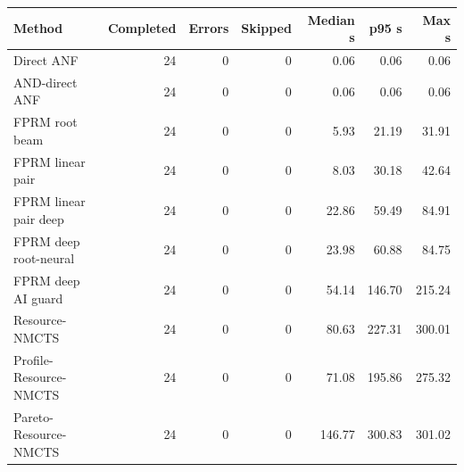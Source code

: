\begin{tabular}{lrrrrrr}
\toprule
Method & Completed & Errors & Skipped & Median s & p95 s & Max s \\
\midrule
Direct ANF & 24 & 0 & 0 & 0.06 & 0.06 & 0.06 \\
AND-direct ANF & 24 & 0 & 0 & 0.06 & 0.06 & 0.06 \\
FPRM root beam & 24 & 0 & 0 & 5.93 & 21.19 & 31.91 \\
FPRM linear pair & 24 & 0 & 0 & 8.03 & 30.18 & 42.64 \\
FPRM linear pair deep & 24 & 0 & 0 & 22.86 & 59.49 & 84.91 \\
FPRM deep root-neural & 24 & 0 & 0 & 23.98 & 60.88 & 84.75 \\
FPRM deep AI guard & 24 & 0 & 0 & 54.14 & 146.70 & 215.24 \\
Resource-NMCTS & 24 & 0 & 0 & 80.63 & 227.31 & 300.01 \\
Profile-Resource-NMCTS & 24 & 0 & 0 & 71.08 & 195.86 & 275.32 \\
Pareto-Resource-NMCTS & 24 & 0 & 0 & 146.77 & 300.83 & 301.02 \\
\bottomrule
\end{tabular}

